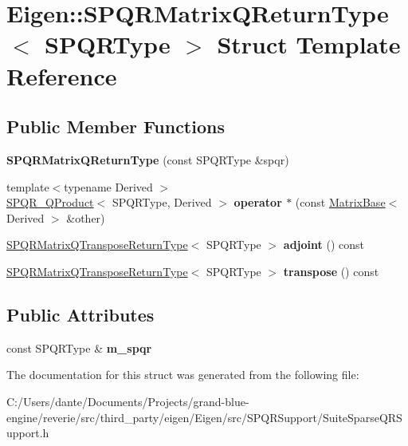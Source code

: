 \hypertarget{struct_eigen_1_1_s_p_q_r_matrix_q_return_type}{}\section{Eigen\+::S\+P\+Q\+R\+Matrix\+Q\+Return\+Type$<$ S\+P\+Q\+R\+Type $>$ Struct Template Reference}
\label{struct_eigen_1_1_s_p_q_r_matrix_q_return_type}
\subsection*{Public Member Functions}
\begin{DoxyCompactItemize}
\item 
\mbox{\label{struct_eigen_1_1_s_p_q_r_matrix_q_return_type_a1879fa283850d7d9deaf7ba62c0410e7}} 
{\bfseries S\+P\+Q\+R\+Matrix\+Q\+Return\+Type} (const S\+P\+Q\+R\+Type \&spqr)
\item 
\mbox{\label{struct_eigen_1_1_s_p_q_r_matrix_q_return_type_aad6bb6cc59ab143b9cadc67894e9ddbb}} 
{\footnotesize template$<$typename Derived $>$ }\\\mbox{\hyperlink{struct_eigen_1_1_s_p_q_r___q_product}{S\+P\+Q\+R\+\_\+\+Q\+Product}}$<$ S\+P\+Q\+R\+Type, Derived $>$ {\bfseries operator $\ast$} (const \mbox{\hyperlink{class_eigen_1_1_matrix_base}{Matrix\+Base}}$<$ Derived $>$ \&other)
\item 
\mbox{\label{struct_eigen_1_1_s_p_q_r_matrix_q_return_type_a0465ee73e6f6740738db4b3aff2995de}} 
\mbox{\hyperlink{struct_eigen_1_1_s_p_q_r_matrix_q_transpose_return_type}{S\+P\+Q\+R\+Matrix\+Q\+Transpose\+Return\+Type}}$<$ S\+P\+Q\+R\+Type $>$ {\bfseries adjoint} () const
\item 
\mbox{\label{struct_eigen_1_1_s_p_q_r_matrix_q_return_type_a36141444649f6a785875777f8af9b366}} 
\mbox{\hyperlink{struct_eigen_1_1_s_p_q_r_matrix_q_transpose_return_type}{S\+P\+Q\+R\+Matrix\+Q\+Transpose\+Return\+Type}}$<$ S\+P\+Q\+R\+Type $>$ {\bfseries transpose} () const
\end{DoxyCompactItemize}
\subsection*{Public Attributes}
\begin{DoxyCompactItemize}
\item 
\mbox{\label{struct_eigen_1_1_s_p_q_r_matrix_q_return_type_a2ad86a0d931566efb5fc785bf70cf579}} 
const S\+P\+Q\+R\+Type \& {\bfseries m\+\_\+spqr}
\end{DoxyCompactItemize}


The documentation for this struct was generated from the following file\+:\begin{DoxyCompactItemize}
\item 
C\+:/\+Users/dante/\+Documents/\+Projects/grand-\/blue-\/engine/reverie/src/third\+\_\+party/eigen/\+Eigen/src/\+S\+P\+Q\+R\+Support/Suite\+Sparse\+Q\+R\+Support.\+h\end{DoxyCompactItemize}
